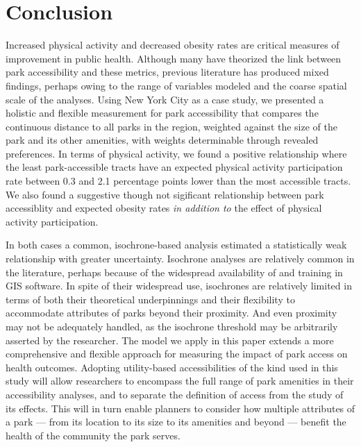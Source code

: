 \documentclass[Afour,sageh.bst]{sagej}
\begin{document}
\hypertarget{conclusion}{%
\section{Conclusion}\label{conclusion}}

Increased physical activity and decreased obesity rates are critical
measures of improvement in public health. Although many have theorized
the link between park accessibility and these metrics, previous
literature has produced mixed findings, perhaps owing to the range of
variables modeled and the coarse spatial scale of the analyses. Using
New York City as a case study, we presented a holistic and flexible
measurement for park accessibility that compares the continuous distance
to all parks in the region, weighted against the size of the park and
its other amenities, with weights determinable through revealed
preferences. In terms of physical activity, we found a positive
relationship where the least park-accessible tracts have an expected
physical activity participation rate between 0.3 and 2.1 percentage
points lower than the most accessible tracts. We also found a suggestive
though not sigificant relationship between park accessiblity and
expected obesity rates \emph{in addition to} the effect of physical
activity participation.

In both cases a common, isochrone-based analysis estimated a
statistically weak relationship with greater uncertainty. Isochrone
analyses are relatively common in the literature, perhaps because of the
widespread availability of and training in GIS software. In spite of
their widespread use, isochrones are relatively limited in terms of both
their theoretical underpinnings and their flexibility to accommodate
attributes of parks beyond their proximity. And even proximity may not
be adequately handled, as the isochrone threshold may be arbitrarily
asserted by the researcher. The model we apply in this paper extends a
more comprehensive and flexible approach for measuring the impact of
park access on health outcomes. Adopting utility-based accessibilities
of the kind used in this study will allow researchers to encompass the
full range of park amenities in their accessibility analyses, and to
separate the definition of access from the study of its effects. This
will in turn enable planners to consider how multiple attributes of a
park --- from its location to its size to its amenities and beyond ---
benefit the health of the community the park serves.




\end{document}
